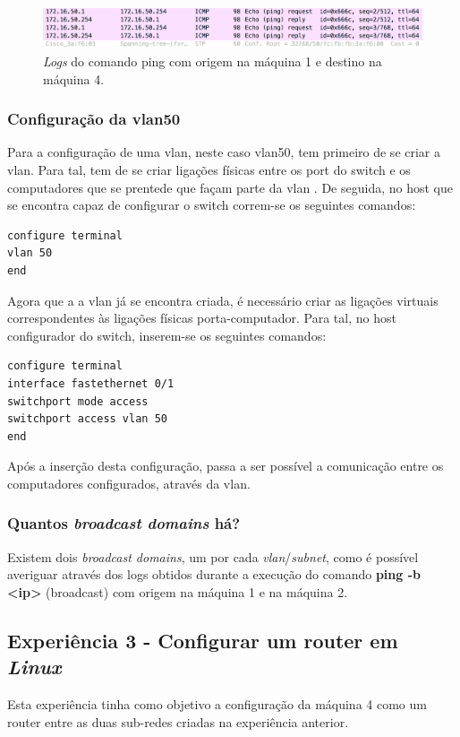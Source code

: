 \documentclass[a4paper, 11pt]{article}
\begin{document}
\begin{figure}[h]
\centering
\includegraphics[scale=0.5]{images/ping1to4.png}
\caption{\textit{Logs} do comando ping com origem na máquina 1 e destino na máquina 4.}
\label{Momentanpol}
\end{figure}

\subsubsection{Configuração da vlan50}
Para a configuração de uma vlan, neste caso vlan50, tem primeiro de se criar a vlan. Para tal, tem de se criar ligações físicas entre os port do switch e os computadores que se prentede que façam parte da vlan . De seguida, no host que se encontra capaz de configurar o switch correm-se os seguintes comandos:
\begin{lstlisting}
configure terminal
vlan 50
end
\end{lstlisting}

Agora que a a vlan já se encontra criada, é necessário criar as ligações virtuais correspondentes às ligações físicas porta-computador. Para tal, no host configurador do switch, inserem-se os seguintes comandos:
\begin{lstlisting}
configure terminal
interface fastethernet 0/1
switchport mode access
switchport access vlan 50
end
\end{lstlisting}

Após a inserção desta configuração, passa a ser possível a comunicação entre os computadores configurados, através da vlan.

\subsubsection{Quantos \textit{broadcast domains} há?}
Existem dois \textit{broadcast domains}, um por cada \textit{vlan}/\textit{subnet}, como é possível averiguar através dos logs obtidos durante a execução do comando \textbf{ping -b \textless ip\textgreater} (broadcast) com origem na máquina 1 e na máquina 2.

\subsection{Experiência 3 - Configurar um router em \textit{Linux}}
Esta experiência tinha como objetivo a configuração da máquina 4 como um router entre as duas sub-redes criadas na experiência anterior.
\end{document}
